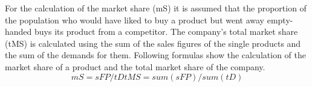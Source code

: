 For the calculation of the market share (\gls{mS}) it is assumed that the proportion of the population who would have liked to buy a product but went away empty-handed buys its product from a competitor. The company's total market share (\gls{tMS}) is calculated using the sum of the sales figures of the single products and the sum of the demands for them. Following formulas show the calculation of the market share of a product and the total market share of the company.  
\begin{equation}
mS = sFP / tD
tMS = sum(sFP) / sum(tD)   
\end{equation}

